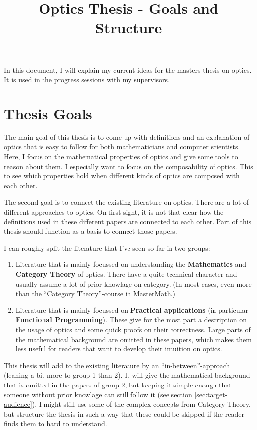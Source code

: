 \documentclass{article}
\title{Optics Thesis - Goals and Structure}
\begin{document}
\maketitle

\begin{framed}
  In this document, I will explain my current ideas for the masters thesis on optics. It is used in the progress sessions with my supervisors. 
\end{framed}

\section{Thesis Goals}

The main goal of this thesis is to come up with definitions and an explanation of optics that is easy to follow for both mathematicians and computer scientists. Here, I focus on the mathematical properties of optics and give some tools to reason about them. I especially want to focus on the composability of optics. This to see which properties hold when different kinds of optics are composed with each other.

The second goal is to connect the existing literature on optics. There are a lot of different approaches to optics. On first sight, it is not that clear how the definitions used in these different papers are connected to each other. Part of this thesis should function as a basis to connect those papers.

\bigskip

I can roughly split the literature that I've seen so far in two groups:
\begin{enumerate}
  \item Literature that is mainly focussed on understanding the \textbf{Mathematics} and \textbf{Category Theory} of optics. There have a quite technical character and usually assume a lot of prior knowlage on category. (In most cases, even more than the ``Category Theory''-course in MasterMath.)
  \item Literature that is mainly focussed on \textbf{Practical applications} (in particular \textbf{Functional Programming}). These give for the most part a description on the usage of optics and some quick proofs on their correctness. Large parts of the mathematical background are omitted in these papers, which makes them less useful for readers that want to develop their intuition on optics.
\end{enumerate}
This thesis will add to the existing literature by an ``in-between''-approach (leaning a bit more to group 1 than 2). It will give the mathematical background that is omitted in the papers of group 2, but keeping it simple enough that someone without prior knowlage can still follow it (see section \ref{sec:target-audience}). I might still use some of the complex concepts from Category Theory, but structure the thesis in such a way that these could be skipped if the reader finds them to hard to understand.
\end{document}
